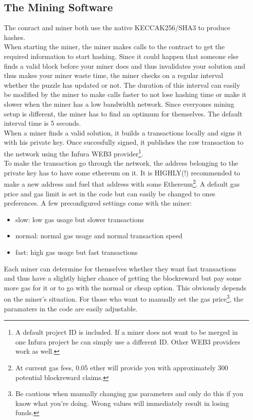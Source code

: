 \documentclass{article}
\begin{document}
\subsection{The Mining Software}
The conract and miner both use the native KECCAK256/SHA3 to produce hashes.\\
When starting the miner, the miner makes calls to the contract to get the required information to start hashing. Since it could happen that someone else finds a valid block before your miner does and thus invalidates your solution and thus makes your miner waste time, the miner checks on a regular interval whether the puzzle has updated or not. The duration of this interval can easily be modified by the miner to make calls faster to not lose hashing time or make it slower when the miner has a low bandwidth network. Since everyones mining setup is different, the miner has to find an optimum for themselves. The default interval time is 5 seconds.\\
When a miner finds a valid solution, it builds a transactions locally and signs it with his private key. Once succesfully signed, it publishes the raw transaction to the network using the Infura WEB3 provider\footnote{A default project ID is included. If a miner does not want to be merged in one Infura project he can simply use a different ID. Other WEB3 providers work as well.}. \\
To make the transaction go through the network, the address belonging to the private key has to have some ethereum on it. It is HIGHLY(!) recommended to make a new address and fuel that address with some Ethereum\footnote{At current gas fees, 0.05 ether will provide you with approximately 300 potential blockreward claims.}.
A default gas price and gas limit is set in the code but can easily be changed to ones preferences. A few preconfigured settings come with the miner:
\begin{itemize}
\item slow: low gas usage but slower transactions
\item normal: normal gas usage and normal transaction speed
\item fast: high gas usage but fast transactions
\end{itemize}
Each miner can determine for themselves whether they want fast transactions and thus have a slightly higher chance of getting the blockreward but pay some more gas for it or to go with the normal or cheap option. This obviously depends on the miner's situation. For those who want to manually set the gas price\footnote{Be cautious when manually changing gas parameters and only do this if you know what you're doing. Wrong values will immediately result in losing funds.}, the paramaters in the code are easily adjustable.
\pagebreak
\end{document}
